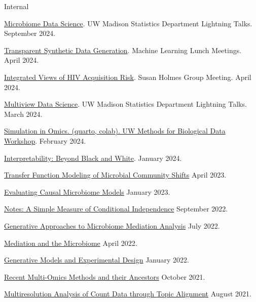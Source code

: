 \documentclass[letterpaper]{article}
\renewenvironment{itemize}{
  \begin{list}{}{
    \setlength{\leftmargin}{1.5em}
  }
}{
  \end{list}
}
\begin{document}
Internal
\begin{itemize}
  \item \href{https://go.wisc.edu/05h9p7}{Microbiome Data Science}. UW Madison Statistics Department Lightning Talks. September 2024.
  \item \href{https://go.wisc.edu/694o2e}{Transparent Synthetic Data Generation}. Machine Learning Lunch Meetings. April 2024.
  \item \href{https://go.wisc.edu/wi1952}{Integrated Views of HIV Acquisition Risk}. Susan Holmes Group Meeting. April 2024.
  \item \href{https://krisrs1128.github.io/talks/2024/20240307/20240307.html#1}{Multiview Data Science}. UW Madison Statistics Department Lightning Talks. March 2024.
  \item \href{https://krisrs1128.github.io/talks/2024/20240207/20240207.html#1}{Simulation in Omics. (\href{https://connect.doit.wisc.edu/content/f01c0d0c-ef3a-4129-bfcd-eb17ae109a89/simulation.html}{quarto}, \href{https://colab.research.google.com/drive/1IyMEQJwkslPzL9FYd5atvyGORqW9IrCI?usp=sharing}{colab}). UW Methods for Biological Data Workshop}. February 2024.
  \item \href{https://github.com/krisrs1128/talks/blob/master/2024/20240119/20240119.pptx}{Interpretability: Beyond Black and White}. January 2024.
  \item \href{https://krisrs1128.github.io/talks/2023/20230414/20230414.html}{Transfer Function Modeling of Microbial Community Shifts} April 2023.
  \item \href{https://krisrs1128.github.io/talks/2023/20230120/20230120.html}{Evaluating Causal Microbiome Models} January 2023.
  \item \href{https://krisrs1128.github.io/talks/2022/20220930/20220930.html}{Notes: A Simple Measure of Conditional Independence} September 2022.
  \item \href{https://drive.google.com/file/d/1n6gEubzFuIRRRYxGewY81k1ZdQS24oKg/view}{Generative Approaches to Microbiome Mediation Analysis} July 2022.
  \item \href{https://drive.google.com/file/d/17xNjMA-pH70wM_gknUnM0A5gr0k87gAo/view}{Mediation and the Microbiome} April 2022.
  \item \href{https://drive.google.com/file/d/1OMIulBki_0an7Lwd0MKPGH1f0OdK0etH/view}{Generative Models and Experimental Design} January 2022.
  \item \href{https://drive.google.com/file/d/1L2crRIcdbql__XZdJuiRXkAKsvwrIZLO/view}{Recent Multi-Omics Methods and their Ancestors} October 2021.
  \item \href{https://drive.google.com/file/d/1VcXF0fAK2IlA3yXeqnJ_1CGC6BP4zPqp/view}{Multiresolution Analysis of Count Data through Topic Alignment} August 2021.
\end{itemize}
\end{document}

